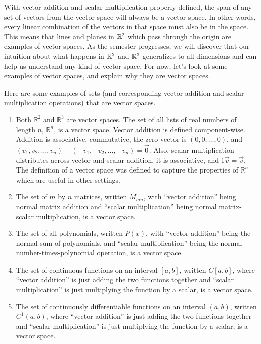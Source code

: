 With vector addition and scalar multiplication properly defined, the span of any set of vectors from the vector space will always be a vector space. In other words, every linear combination of the vectors in that space must also be in the space. This means that lines and planes in $\mathbb{R}^3$ which pass through the origin are examples of vector spaces. As the semester progresses, we will discover that our intuition about what happens in $\mathbb{R}^2$ and $\mathbb{R}^3$ generalizes to all dimensions and can help us understand any kind of vector space.  For now, let's look at some examples of vector spaces, and explain why they are vector spaces.

\begin{example}
Here are some examples of sets (and corresponding vector addition and scalar multiplication operations) that are vector spaces.
\begin{enumerate}
	\item Both ${\mathbb{R}}^2$ and ${\mathbb{R}}^3$ are vector spaces. The set of all lists of real numbers of length $n$, ${\mathbb{R}}^n$, is a vector space.  Vector addition is defined component-wise. Addition is associative, commutative, the zero vector is $(0,0,\ldots,0)$, and $(v_1,v_2,\ldots,v_n)+(-v_1,-v_2,\ldots,-v_n)=\vec 0$. Also, scalar multiplication distributes across vector and scalar addition, it is associative, and $1\vec v=\vec v$.  The definition of a vector space was defined to capture the properties of ${\mathbb{R}}^n$ which are useful in other settings.
	\item The set of $m$ by $n$ matrices, written $M_{mn}$, with ``vector addition'' being normal matrix addition and ``scalar multiplication'' being normal matrix-scalar multiplication, is a vector space.
	\item The set of all polynomials, written $P(x)$, with ``vector addition'' being the normal sum of polynomials, and ``scalar multiplication'' being the normal number-times-polynomial operation, is a vector space.
	\item The set of continuous functions on an interval $[a,b]$, written $C[a,b]$, where ``vector addition'' is just adding the two functions together and ``scalar multiplication'' is just multiplying the function by a scalar, is a vector space.
	\item The set of continuously differentiable functions on an interval $(a,b)$, written $C^1(a,b)$, where ``vector addition'' is just adding the two functions together and ``scalar multiplication'' is just multiplying the function by a scalar, is a vector space.
\end{enumerate}
\end{example}
